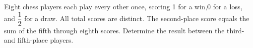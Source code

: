 Eight chess players each play every other once, scoring 1 for a win,0 for a loss, and $\dfrac{1}{2}$ for a draw. All total scores are distinct. The second-place score equals the sum of the fifth through eighth scores. Determine the result between the third- and fifth-place players.
